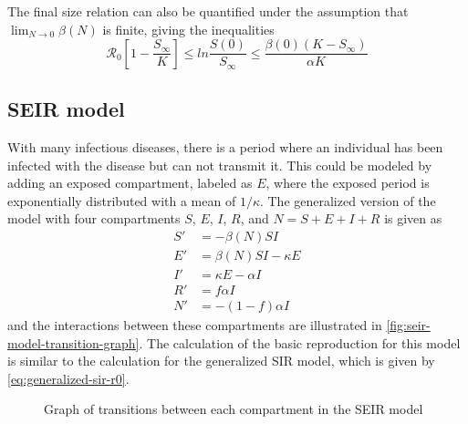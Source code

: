 The final size relation can also be quantified under the assumption that $\lim_{N \to 0} \beta(N)$ is finite, giving the inequalities \cite{brauerCompartmentalModelsEpidemiology2008}
\begin{equation*}
    \mathcal{R}_0 \left[ 1 - \frac{S_\infty}{K} \right] \leq ln \frac{S(0)}{S_\infty} \leq \frac{\beta(0)(K - S_\infty)}{\alpha K}
\end{equation*}

\subsection{SEIR model}
\label{sec:literature-review-compartmental-seir-model}

With many infectious diseases, there is a period where an individual has been infected with the disease but can not transmit it.
This could be modeled by adding an exposed compartment, labeled as $E$, where the exposed period is exponentially distributed with a mean of $1 / \kappa$.
The generalized version of the model with four compartments $S$, $E$, $I$, $R$, and $N = S + E + I + R$ is given as \cite{brauerCompartmentalModelsEpidemiology2008}
\begin{align*}
    S' &= - \beta(N)SI \\
    E' &= \beta(N)SI - \kappa E \\
    I' &= \kappa E - \alpha I \\
    R' &= f \alpha I \\
    N' &= - (1 - f) \alpha I
\end{align*}
and the interactions between these compartments are illustrated in \autoref{fig:seir-model-transition-graph}.
The calculation of the basic reproduction for this model is similar to the calculation for the generalized \gls{SIR} model, which is given by \autoref{eq:generalized-sir-r0}.

\begin{figure}
    \centering
    \caption{Graph of transitions between each compartment in the SEIR model}
    \label{fig:seir-model-transition-graph}
\end{figure}

